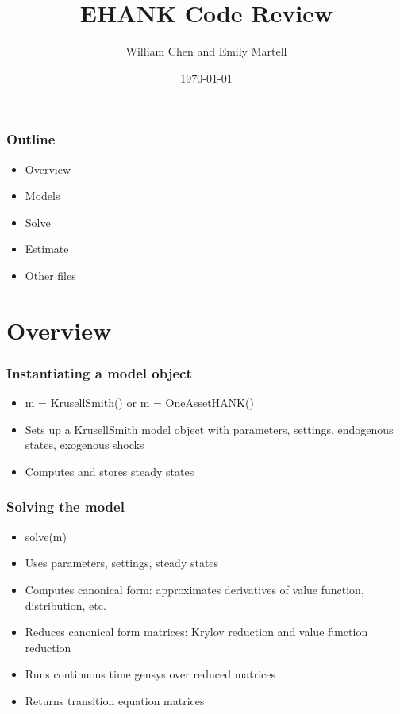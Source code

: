 \documentclass{beamer}
\begin{document}
\title{EHANK Code Review}
\author{William Chen and Emily Martell}
\date{\today}

\begin{frame}
\titlepage
\end{frame}

\begin{frame}
\frametitle{Outline}
\begin{itemize}
\item Overview
\item Models
\item Solve
\item Estimate
\item Other files
\end{itemize}
\end{frame}

\section{Overview}

\begin{frame}
\frametitle{Instantiating a model object}
\begin{itemize}
\item m = KrusellSmith() or m = OneAssetHANK()
\item Sets up a KrusellSmith model object with parameters, settings, endogenous states, exogenous shocks
\item Computes and stores steady states
\end{itemize}
\end{frame}

\begin{frame}
\frametitle{Solving the model}
\begin{itemize}
\item solve(m)
\item Uses parameters, settings, steady states
\item Computes canonical form: approximates derivatives of value function, distribution, etc.
\item Reduces canonical form matrices: Krylov reduction and value function reduction
\item Runs continuous time gensys over reduced matrices
\item Returns transition equation matrices
\end{itemize}
\end{frame}
\end{document}
